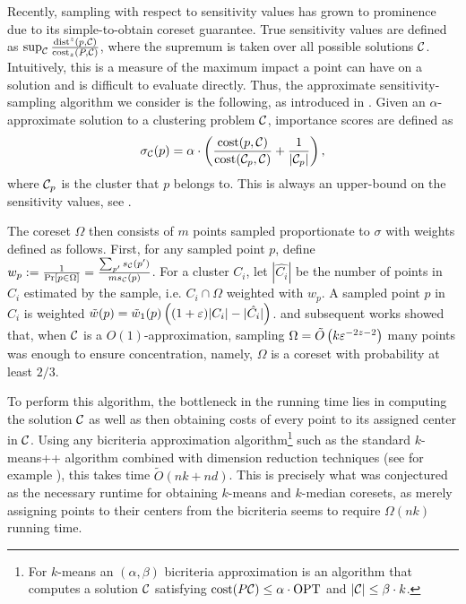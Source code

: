 Recently, sampling with respect to sensitivity values has grown to prominence due to its simple-to-obtain coreset guarantee.  True sensitivity values are defined
as $\sup_{\mathcal C} \frac{\operatorname{dist}^z(p, \mathcal C)}{\operatorname{cost}_z(P, \mathcal C)}$, where the supremum is taken over all possible solutions $\mathcal C$. Intuitively, this is a measure
of the maximum impact a point can have on a solution and is difficult to evaluate directly.
Thus, the approximate sensitivity-sampling algorithm we consider is the following, as introduced in \cite{FeldmanL11}.
Given an $\alpha$-approximate solution to a clustering problem $\mathcal C$, importance scores are defined as
\begin{equation}
\label{eq:sensitivity}
\sigma_\mathcal C(p) = \alpha \cdot \left( \dfrac{\operatorname{cost}(p, \mathcal C)}{\operatorname{cost}(\mathcal C_{p}, \mathcal C)} + \dfrac{1}{|\mathcal C_p|} \right),
\end{equation}
where $\mathcal C_p$ is the cluster that $p$ belongs to. This is always an upper-bound on the sensitivity values, see \cite{FL11,FeldmanSS20}.

The coreset $\Omega$ then consists of $m$ points sampled proportionate to $\sigma$ with weights defined as follows. First, for any sampled point $p$, define $w_p :=
\frac{1}{\Pr[p \in \Omega]} = \frac{\sum_{p'} s_\mathcal C(p')}{m s_\mathcal C(p)}$. For a cluster $C_i$, let $|\hat{C_i}|$ be the number of points in $C_i$ estimated by the
sample, i.e. $C_i \cap \Omega$ weighted with $w_p$. A sampled point $p$ in $C_i$ is
weighted $\tilde w(p) = \tilde w_1(p) \left( (1+\varepsilon)|C_i| - |\hat{C_i}|\right)$.  \cite{FeldmanL11} and subsequent works showed that, when $\mathcal C$ is
a $O(1)$-approximation, sampling $\Omega = \tilde O\left( k \varepsilon^{-2z-2}\right)$ many points was enough to ensure concentration, namely, $\Omega$ is a coreset with
probability at least $2/3$.

To perform this algorithm, the bottleneck in the running time lies in computing the solution $\mathcal C$ as well as then obtaining costs of every point to its
assigned center in $\mathcal C$. Using any bicriteria approximation algorithm\footnote{For $k$-means an $(\alpha,\beta)$ bicriteria approximation is an algorithm
that computes a solution $\mathcal C$ satisfying $\operatorname{cost}(P\mathcal C)\leq \alpha\cdot \text{OPT}$ and $|\mathcal C|\leq \beta\cdot k$.} such as the standard $k$-means++ algorithm
\cite{ArV07} combined with dimension reduction techniques (see for example \cite{BecchettiBC0S19,CohenEMMP15,MakarychevMR19}), this takes time $\tilde O(nk
+nd)$. This is precisely what was conjectured as the necessary runtime for obtaining $k$-means and $k$-median coresets, as merely assigning points to their
centers from the bicriteria seems to require $\Omega(nk)$ running time.

